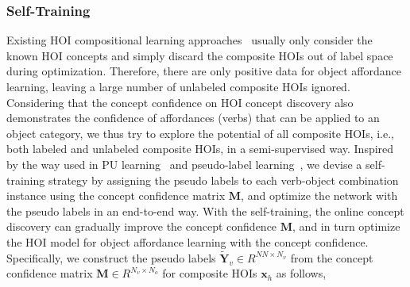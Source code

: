 \documentclass[runningheads]{llncs}
\begin{document}
\subsubsection{Self-Training}

Existing HOI compositional learning approaches~\cite{hou2020visual,hou2021fcl,hou2021atl} usually only consider the known HOI concepts and simply discard the composite HOIs out of label space during optimization. Therefore, there are only positive data for object affordance learning, leaving a large number of unlabeled composite HOIs ignored. Considering that the concept confidence on HOI concept discovery also demonstrates the confidence of affordances (verbs) that can be applied to an object category, we thus try to explore the potential of all composite HOIs, i.e., both labeled and unlabeled composite HOIs,  in a semi-supervised way. Inspired by the way used in PU learning~\cite{de1999positive} and pseudo-label learning~\cite{lee2013pseudo}, we devise a self-training strategy by assigning the pseudo labels to each verb-object combination instance using the concept confidence matrix $\mathbf{M}$, and optimize the network with the pseudo labels in an end-to-end way. With the self-training, the online concept discovery can gradually improve the concept confidence $\mathbf{M}$, and in turn optimize the HOI model for object affordance learning with the concept confidence.
Specifically, we construct the pseudo labels $\mathbf{\tilde{Y}}_v \in R ^{NN \times N_v}$ from the concept confidence matrix $\mathbf{M} \in R^{N_v \times N_o}$ for composite HOIs $\mathbf{x}_{h}$ as follows,
\end{document}
